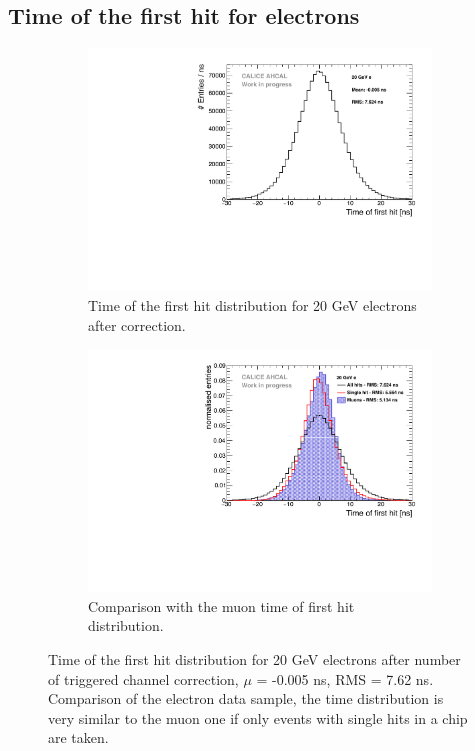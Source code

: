 \subsection{Time of the first hit for electrons}
\label{subsec:Electron_Final}

\begin{figure}[t]
	\begin{subfigure}[t]{0.45\textwidth}
		\centering
		\includegraphics[width=1\textwidth]{chap5/fig_AHCAL_timing/Electrons/Timing_AllLayers_20GeV.pdf}
		\caption{Time of the first hit distribution for 20 GeV electrons after correction.}\label{fig:timing_electrons_corr}
	\end{subfigure}
	\hfill
	\begin{subfigure}[t]{0.45\textwidth}
		\centering
		\includegraphics[width=1\textwidth]{chap5/fig_AHCAL_timing/Electrons/ComparisonAll_ElectronsSingleHit.pdf}
		\caption{Comparison with the muon time of first hit distribution.}\label{fig:timing_electron_muon_comp}
	\end{subfigure}
	\caption{ Time of the first hit distribution for 20 GeV electrons after number of triggered channel correction, $\mu$ = -0.005 ns, RMS = 7.62 ns.  Comparison of the electron data sample, the time distribution is very similar to the muon one if only events with single hits in a chip are taken.}
\end{figure}


